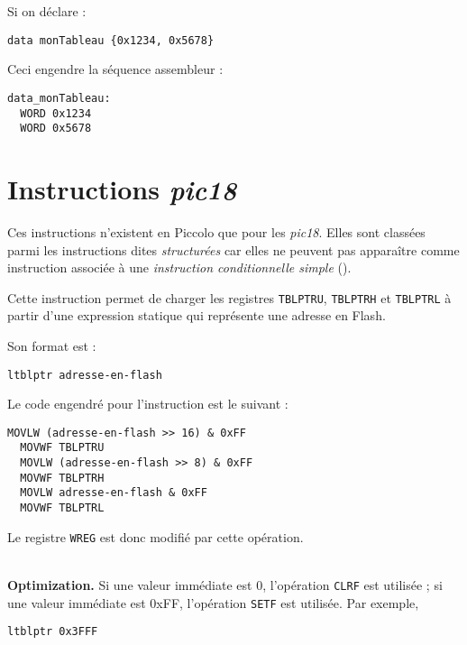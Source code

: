 Si on déclare :
\begin{lstlisting}[language=piccolo]
  data monTableau {0x1234, 0x5678}
\end{lstlisting}

Ceci engendre la séquence assembleur :

\begin{lstlisting}[language=assembleur]
data_monTableau:
  WORD 0x1234
  WORD 0x5678
\end{lstlisting}





\section{Instructions \emph{pic18}}

Ces instructions n'existent en Piccolo que pour les \emph{pic18}. Elles sont classées parmi les instructions dites \emph{structurées} car elles ne peuvent pas apparaître comme instruction associée à une \emph{instruction conditionnelle simple} ().




Cette instruction permet de charger les registres \texttt{TBLPTRU}, \texttt{TBLPTRH} et \texttt{TBLPTRL} à partir d'une expression statique qui représente une adresse en Flash.

Son format est :
\begin{lstlisting}[language=piccolo]
  ltblptr adresse-en-flash
\end{lstlisting}

Le code engendré pour l'instruction est le suivant :
\begin{lstlisting}[language=assembleur]
  MOVLW (adresse-en-flash >> 16) & 0xFF
  MOVWF TBLPTRU
  MOVLW (adresse-en-flash >> 8) & 0xFF
  MOVWF TBLPTRH
  MOVLW adresse-en-flash & 0xFF
  MOVWF TBLPTRL
\end{lstlisting}

Le registre \texttt{WREG} est donc modifié par cette opération.

~\\
\textbf{Optimization.} Si une valeur immédiate est 0, l'opération \texttt{CLRF} est utilisée ; si une valeur immédiate est 0xFF, l'opération \texttt{SETF} est utilisée. Par exemple, 
\begin{lstlisting}[language=piccolo]
  ltblptr 0x3FFF
\end{lstlisting}

